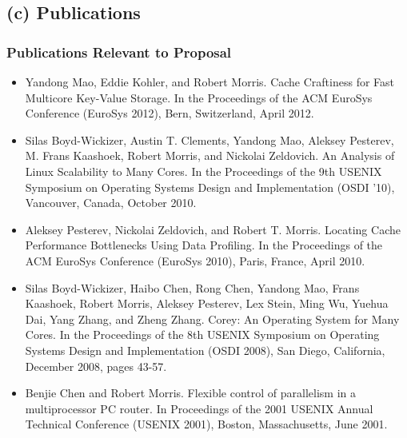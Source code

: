 \documentclass{article}
\begin{document}
\subsection*{(c) Publications}

\subsubsection*{Publications Relevant to Proposal}
\begin{itemize}

\item Yandong Mao, Eddie Kohler, and Robert Morris. Cache Craftiness
  for Fast Multicore Key-Value Storage. In the Proceedings of the ACM
  EuroSys Conference (EuroSys 2012), Bern, Switzerland, April 2012.

\item Silas Boyd-Wickizer, Austin T. Clements, Yandong Mao, Aleksey
  Pesterev, M. Frans Kaashoek, Robert Morris, and Nickolai Zeldovich.
  An Analysis of Linux Scalability to Many Cores. In the Proceedings
  of the 9th USENIX Symposium on Operating Systems Design and
  Implementation (OSDI '10), Vancouver, Canada, October 2010.

\item Aleksey Pesterev, Nickolai Zeldovich, and Robert T. Morris.
  Locating Cache Performance Bottlenecks Using Data Profiling. In the
  Proceedings of the ACM EuroSys Conference (EuroSys 2010), Paris,
  France, April 2010.

\item Silas Boyd-Wickizer, Haibo Chen, Rong Chen, Yandong Mao, Frans
  Kaashoek, Robert Morris, Aleksey Pesterev, Lex Stein, Ming Wu,
  Yuehua Dai, Yang Zhang, and Zheng Zhang. Corey: An Operating System
  for Many Cores. In the Proceedings of the 8th USENIX Symposium on
  Operating Systems Design and Implementation (OSDI 2008), San Diego,
  California, December 2008, pages 43-57.

\item Benjie Chen and Robert Morris. Flexible control of parallelism
  in a multiprocessor PC router. In Proceedings of the 2001 USENIX
  Annual Technical Conference (USENIX 2001), Boston, Massachusetts,
  June 2001.

\end{itemize}
\end{document}
